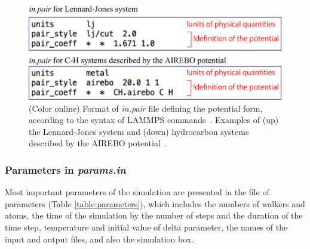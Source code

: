 \documentclass[preprint,12pt]{elsarticle}
\begin{document}
\begin{figure}[!t]
 \begin{center}
 \includegraphics[scale=0.5]{in_pair.pdf}
  \caption{(Color online)  Format of {\it in.pair} file defining the potential form, according to the syntax of LAMMPS commands~\cite{LAMMPS}. Examples of (up) the Lennard-Jones system and (down) hydrocarbon systems described by the AIREBO potential~\cite{airbo}.}
  \label{fig:inpair}
 \end{center}
\end{figure}




\subsubsection{Parameters in {\it params.in}}

Most important parameters of the simulation are presented in the file of parameters (Table \ref{table:parameters}), which includes the numbers of walkers and atoms, the time of the simulation by the number of steps and the duration of the time step, temperature and initial value of delta parameter, the names of the input and output files, and also the simulation box. 
\end{document}
